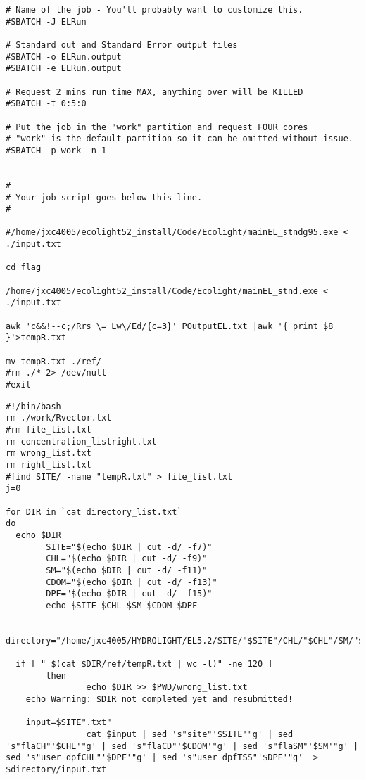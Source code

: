 \begin{appendices}
\begin{lstlisting}
# Name of the job - You'll probably want to customize this.
#SBATCH -J ELRun

# Standard out and Standard Error output files
#SBATCH -o ELRun.output
#SBATCH -e ELRun.output

# Request 2 mins run time MAX, anything over will be KILLED
#SBATCH -t 0:5:0

# Put the job in the "work" partition and request FOUR cores
# "work" is the default partition so it can be omitted without issue.
#SBATCH -p work -n 1


#
# Your job script goes below this line.  
# 

#/home/jxc4005/ecolight52_install/Code/Ecolight/mainEL_stndg95.exe < ./input.txt

cd flag

/home/jxc4005/ecolight52_install/Code/Ecolight/mainEL_stnd.exe < ./input.txt

awk 'c&&!--c;/Rrs \= Lw\/Ed/{c=3}' POutputEL.txt |awk '{ print $8 }'>tempR.txt

mv tempR.txt ./ref/
#rm ./* 2> /dev/null
#exit

\end{lstlisting}


\singlespacing
{}
\renewcommand{\lstlistingname}{Code}
\begin{lstlisting}
#!/bin/bash
rm ./work/Rvector.txt
#rm file_list.txt
rm concentration_listright.txt
rm wrong_list.txt
rm right_list.txt
#find SITE/ -name "tempR.txt" > file_list.txt
j=0

for DIR in `cat directory_list.txt`
do
  echo $DIR
        SITE="$(echo $DIR | cut -d/ -f7)"
        CHL="$(echo $DIR | cut -d/ -f9)"
        SM="$(echo $DIR | cut -d/ -f11)"
        CDOM="$(echo $DIR | cut -d/ -f13)"
        DPF="$(echo $DIR | cut -d/ -f15)"
        echo $SITE $CHL $SM $CDOM $DPF

  directory="/home/jxc4005/HYDROLIGHT/EL5.2/SITE/"$SITE"/CHL/"$CHL"/SM/"$SM"/CDOM/"$CDOM"/DPF/"$DPF

  if [ " $(cat $DIR/ref/tempR.txt | wc -l)" -ne 120 ]
        then
                echo $DIR >> $PWD/wrong_list.txt
    echo Warning: $DIR not completed yet and resubmitted!
    
    input=$SITE".txt"
                cat $input | sed 's"site"'$SITE'"g' | sed 's"flaCH"'$CHL'"g' | sed 's"flaCD"'$CDOM'"g' | sed 's"flaSM"'$SM'"g' | sed 's"user_dpfCHL"'$DPF'"g' | sed 's"user_dpfTSS"'$DPF'"g'  > $directory/input.txt


\end{lstlisting}
\end{appendices}

